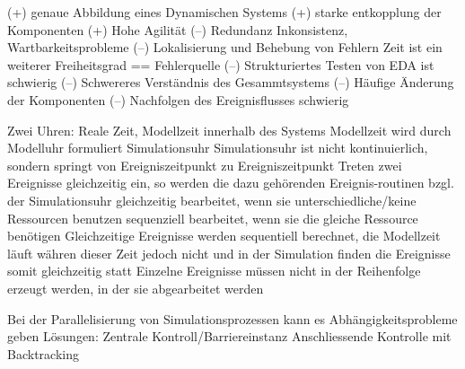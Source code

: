 \documentclass[ngerman,a4paper,12pt]{scrreprt}
\begin{document}


\ul
	\li (+) genaue Abbildung eines Dynamischen Systems
	\li (+) starke entkopplung der Komponenten
	\li (+) Hohe Agilität
	\li (--) Redundanz \ra Inkonsistenz, Wartbarkeitsprobleme
	\li (--) Lokalisierung und Behebung von Fehlern \ra Zeit ist ein weiterer Freiheitsgrad == Fehlerquelle
	\li (--) Strukturiertes Testen von EDA ist schwierig
	\li (--) Schwereres Verständnis des Gesammtsystems
	\li (--) Häufige Änderung der Komponenten
	\li (--) Nachfolgen des Ereignisflusses schwierig
\ulE


\ul
	\li Zwei Uhren: Reale Zeit, Modellzeit innerhalb des Systems
	\li Modellzeit wird durch Modelluhr formuliert \ra Simulationsuhr
	\li Simulationsuhr ist nicht kontinuierlich, sondern springt von Ereigniszeitpunkt zu Ereigniszeitpunkt
	\li Treten zwei Ereignisse gleichzeitig ein, so werden die dazu gehörenden
Ereignis-routinen bzgl. der Simulationsuhr
		\ul
			\li gleichzeitig bearbeitet, wenn sie unterschiedliche/keine Ressourcen benutzen
			\li	sequenziell bearbeitet, wenn sie die gleiche Ressource benötigen
		\ulE
	\li Gleichzeitige Ereignisse werden sequentiell berechnet, die Modellzeit läuft währen dieser Zeit jedoch nicht und in der Simulation finden die Ereignisse somit gleichzeitig statt
	\li {}
	\li Einzelne Ereignisse müssen nicht in der Reihenfolge erzeugt werden, in der sie abgearbeitet werden
\ulE


\ul
	\li Bei der Parallelisierung von Simulationsprozessen kann es Abhängigkeitsprobleme geben
	\li Lösungen: 
		\ul
			\li Zentrale Kontroll/Barriereinstanz
			\li Anschliessende Kontrolle mit Backtracking
		\ulE
\ulE
\end{document}
